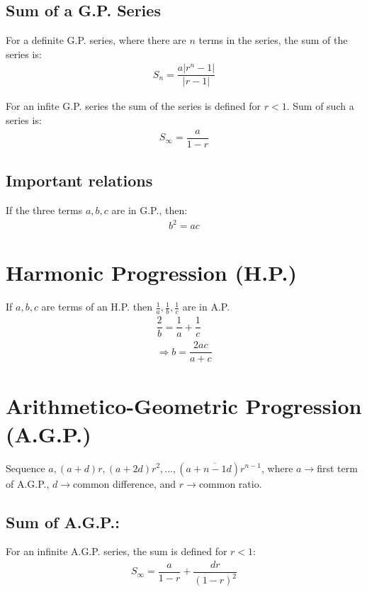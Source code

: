 \documentclass[../main.tex]{subfiles}
\begin{document}
	\subsection{Sum of a G.P.  Series}
	For a definite G.P. series, where there are $n$ terms in the series, the sum of the series is:
	\begin{align}
		S_n=\dfrac{a\lvert r^n-1 \rvert}{\lvert r-1 \rvert}
	\end{align}
	
	For an infite G.P. series the sum of the series is defined for $r<1$. Sum of such a series is:
	\begin{align}
		S_\infty=\dfrac{a}{1-r}
	\end{align}
	
	\subsection{Important relations}
	If the three terms $a,b,c$ are in G.P., then:
	\begin{align}
		b^2=ac
	\end{align}


	\section{Harmonic Progression (H.P.)}
	If $a,b,c$ are terms of an H.P. then $\frac{1}{a},\frac{1}{b},\frac{1}{c}$ are in A.P.
	\begin{align}
		\dfrac{2}{b} = \dfrac{1}{a} + \dfrac{1}{c} \\
		\Rightarrow b = \dfrac{2ac}{a+c}
	\end{align}

	
	\section{\large{Arithmetico-Geometric Progression (A.G.P.)}}
	Sequence $a, (a+d)r, (a+2d)r^2,...,(a+\overline{n-1}d)r^{n-1}$, where $a\rightarrow$first term of A.G.P., $d\rightarrow$common difference, and $r\rightarrow$common ratio.
	\subsection{Sum of A.G.P.:}
	For an infinite A.G.P. series, the sum is defined for $r<1$:
	\begin{align}
		S_\infty=\dfrac{a}{1-r}+\dfrac{dr}{(1-r)^2}
	\end{align}
\end{document}

